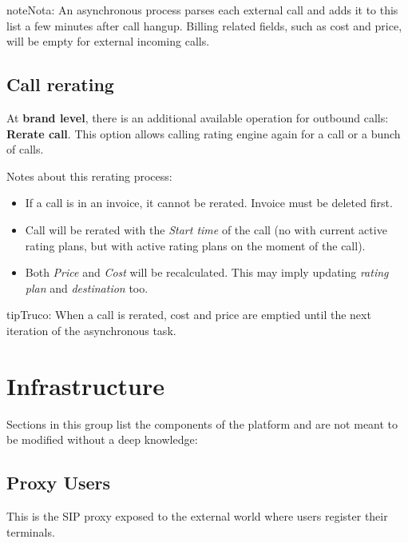 \documentclass[letterpaper,10pt,spanish]{sphinxmanual}
\begin{document}
\begin{notice}{note}{Nota:}
An asynchronous process parses each external call and adds it to this list a few minutes after call hangup. Billing related fields, such as cost and price, will be empty for external incoming calls.
\end{notice}


\subsection{Call rerating}
\label{administration_portal/platform/external_calls:call-rerating}
At \textbf{brand level}, there is an additional available operation for outbound calls: \textbf{Rerate call}. This option allows calling rating engine again for a call or a bunch of calls.

Notes about this rerating process:
\begin{itemize}
\item {} 
If a call is in an invoice, it cannot be rerated. Invoice must be deleted first.

\item {} 
Call will be rerated with the \emph{Start time} of the call (no with current active rating plans, but with active rating plans
on the moment of the call).

\item {} 
Both \emph{Price} and \emph{Cost} will be recalculated. This may imply updating \emph{rating plan} and \emph{destination} too.

\end{itemize}

\begin{notice}{tip}{Truco:}
When a call is rerated, cost and price are emptied until the next iteration of the asynchronous task.
\end{notice}


\section{Infrastructure}
\label{administration_portal/platform/infrastructure/index:infrastructure}\label{administration_portal/platform/infrastructure/index::doc}
Sections in this group list the components of the platform and are not meant to be modified without a deep knowledge:


\subsection{Proxy Users}
\label{administration_portal/platform/infrastructure/proxy_users:proxy-users}\label{administration_portal/platform/infrastructure/proxy_users:proxyusers}\label{administration_portal/platform/infrastructure/proxy_users::doc}
This is the SIP proxy exposed to the external world where users register their
terminals.
\end{document}

